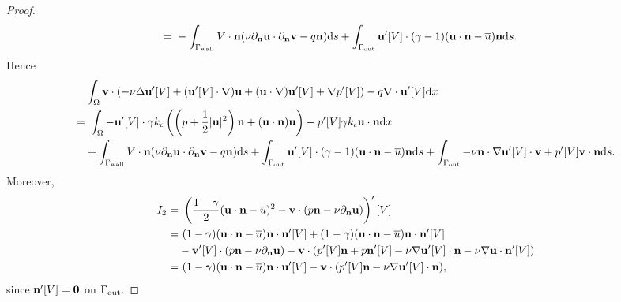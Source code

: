 \documentclass[oneside,11pt]{book}
\numberwithin{equation}{section}
\begin{document}
\begin{proof}
\begin{align}
        =&\ -\int_{\Gamma_{\rm wall}} V\cdot{\bf n}(\nu\partial_{\bf n}{\bf u}\cdot\partial_{\bf n}{\bf v} - q{\bf n}){\rm d}s + \int_{\Gamma_{\rm out}} {\bf u}'[V]\cdot(\gamma - 1)({\bf u}\cdot{\bf n} - \overline{u}){\bf n}{\rm d}s.
    \end{align}
    Hence
    \begin{align}
        &\int_\Omega {\bf v}\cdot(-\nu\Delta{\bf u}'[V] + ({\bf u}'[V]\cdot\nabla){\bf u} + ({\bf u}\cdot\nabla){\bf u}'[V] + \nabla p'[V]) - q\nabla\cdot{\bf u}'[V]{\rm d}x\\
        =&\ \int_\Omega -{\bf u}'[V]\cdot\gamma k_\epsilon\left(\left(p + \frac{1}{2}|{\bf u}|^2\right){\bf n} + ({\bf u}\cdot{\bf n}){\bf u}\right) - p'[V]\gamma k_\epsilon{\bf u}\cdot{\bf n}{\rm d}x\\
        &+ \int_{\Gamma_{\rm wall}} V\cdot{\bf n}(\nu\partial_{\bf n}{\bf u}\cdot\partial_{\bf n}{\bf v} - q{\bf n}){\rm d}s + \int_{\Gamma_{\rm out}} {\bf u}'[V]\cdot(\gamma - 1)({\bf u}\cdot{\bf n} - \overline{u}){\bf n}{\rm d}s + \int_{\Gamma_{\rm out}} -\nu{\bf n}\cdot\nabla{\bf u}'[V]\cdot{\bf v} + p'[V]{\bf v}\cdot{\bf n}{\rm d}s.
    \end{align}
    Moreover,
    \begin{align}
        I_2 =&\ \left(\frac{1 - \gamma}{2}({\bf u}\cdot{\bf n} - \overline{u})^2 - {\bf v}\cdot(p{\bf n} - \nu\partial_{\bf n}{\bf u})\right)'[V]\\
        =&\ (1 - \gamma)({\bf u}\cdot{\bf n} - \overline{u}){\bf n}\cdot{\bf u}'[V] + (1 - \gamma)({\bf u}\cdot{\bf n} - \overline{u}){\bf u}\cdot{\bf n}'[V] \\
        &- {\bf v}'[V]\cdot(p{\bf n} - \nu\partial_{\bf n}{\bf u}) - {\bf v}\cdot(p'[V]{\bf n} + p{\bf n}'[V] - \nu\nabla{\bf u}'[V]\cdot{\bf n} - \nu\nabla{\bf u}\cdot{\bf n}'[V])\\
        =&\ (1 - \gamma)({\bf u}\cdot{\bf n} - \overline{u}){\bf n}\cdot{\bf u}'[V] - {\bf v}\cdot(p'[V]{\bf n} - \nu\nabla{\bf u}'[V]\cdot{\bf n}),
    \end{align}
    since ${\bf n}'[V] = {\bf 0}$ on $\Gamma_{\rm out}$.
    

\end{proof}
\end{document}
